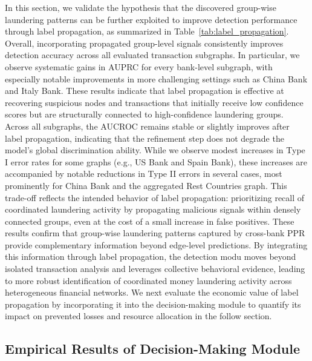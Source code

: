 \documentclass[11pt,english]{article}
\begin{document}
In this section, we validate the hypothesis that the discovered group-wise laundering patterns can be further exploited to improve detection performance through label propagation, as summarized in Table~\ref{tab:label_propagation}. Overall, incorporating propagated group-level signals consistently improves detection accuracy across all evaluated transaction subgraphs. In particular, we observe systematic gains in AUPRC for every bank-level subgraph, with especially notable improvements in more challenging settings such as China Bank and Italy Bank. These results indicate that label propagation is effective at recovering suspicious nodes and transactions that initially receive low confidence scores but are structurally connected to high-confidence laundering groups. Across all subgraphs, the AUCROC remains stable or slightly improves after label propagation, indicating that the refinement step does not degrade the model’s global discrimination ability. While we observe modest increases in Type I error rates for some graphs (e.g., US Bank and Spain Bank), these increases are accompanied by notable reductions in Type II errors in several cases, most prominently for China Bank and the aggregated Rest Countries graph. This trade-off reflects the intended behavior of label propagation: prioritizing recall of coordinated laundering activity by propagating malicious signals within densely connected groups, even at the cost of a small increase in false positives. These results confirm that group-wise laundering patterns captured by cross-bank PPR provide complementary information beyond edge-level predictions. By integrating this information through label propagation, the detection modu moves beyond isolated transaction analysis and leverages collective behavioral evidence, leading to more robust identification of coordinated money laundering activity across heterogeneous financial networks. We next evaluate the economic value of label propagation by incorporating it into the decision-making module to quantify its impact on prevented losses and resource allocation in the follow section.




\subsection{Empirical Results of Decision-Making Module}
\end{document}
